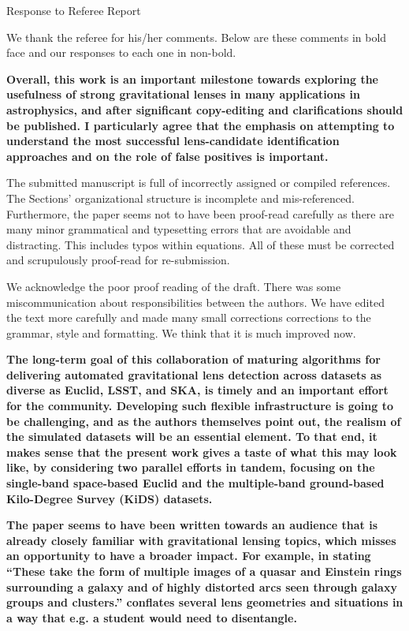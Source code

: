 \documentclass[11pt,a4paper]{article}
\author{R.B. Metcalf}
\begin{document}
Response to Referee Report

We thank the referee for his/her comments.  Below are these comments in bold face and our 
responses to each one in non-bold.

{\bf 
Overall, this work is an important milestone towards exploring the usefulness of strong gravitational lenses in many applications in astrophysics, and after significant copy-editing and clarifications should be published.  I particularly agree that the emphasis on attempting to understand the most successful lens-candidate identification approaches and on the role of false positives is important. 

The submitted manuscript is full of incorrectly assigned or compiled references.  The Sections’ organizational structure is incomplete and mis-referenced. Furthermore, the paper seems not to have been proof-read carefully as there are many minor grammatical and typesetting errors that are avoidable and distracting.  This includes typos within equations.  All of these must be corrected and scrupulously proof-read for re-submission.  }

We acknowledge the poor proof reading of the draft.  There was some miscommunication about responsibilities between the authors.  We have edited the text more carefully and made many small corrections corrections to the grammar, style and formatting.  We think that it is much improved now.

{\bf
The long-term goal of this collaboration of maturing algorithms for delivering automated gravitational lens detection across datasets as diverse as Euclid, LSST, and SKA, is timely and an important effort for the community.  Developing such flexible infrastructure is going to be challenging, and as the authors themselves point out, the realism of the simulated datasets will be an essential element. To that end, it makes sense that the present work gives a taste of what this may look like, by considering two parallel efforts in tandem, focusing on the single-band space-based Euclid and the multiple-band ground-based Kilo-Degree Survey (KiDS) datasets. 
}

{\bf
The paper seems to have been written towards an audience that is already closely familiar with gravitational lensing topics, which misses an opportunity to have a broader impact. For example, in stating “These take the form of multiple images of a quasar and Einstein rings surrounding a galaxy and of highly distorted arcs seen through galaxy groups and clusters.” conflates several lens geometries and situations in a way that e.g. a student would need to disentangle. 
}
\end{document}
